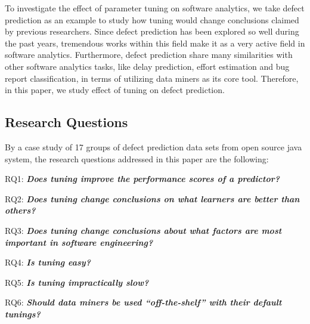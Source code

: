 To investigate the effect of parameter tuning on software analytics, we take defect prediction as
an example to study how tuning would change conclusions claimed by previous researchers. Since defect prediction
has been explored so well during the past years, tremendous works within this field make it as a very 
active field in software analytics. Furthermore, defect prediction share many similarities with other
software analytics tasks, like delay prediction, effort estimation and bug report classification,
in terms of utilizing data miners as its core tool. Therefore, in this paper, we study effect of tuning
on defect prediction.

\subsection{Research Questions}
By a case study of 17 groups of defect prediction data sets from open source java system,  the research questions addressed in this paper are the following:

\bi
\item RQ1: {\bf{\em Does   tuning    improve the performance scores of a predictor?}} %
\item RQ2: {\bf {\em Does tuning change conclusions on what learners are better than others?}} 
\item RQ3: {\bf {\em Does tuning change conclusions about what factors are most important in software engineering?}} %
\item  RQ4: {\bf {\em Is tuning easy?}} %
\item RQ5: {\bf {\em Is tuning impractically slow?}} %
\item RQ6: {\bf{\em Should data miners be used ``off-the-shelf'' with their default tunings?}}
\ei

